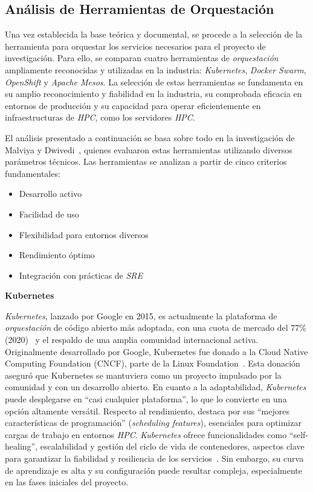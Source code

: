 \subsection{Análisis de Herramientas de Orquestación}
Una vez establecida la base teórica y documental, se procede a la selección de la herramienta para orquestar los servicios necesarios para el proyecto de investigación. Para ello, se comparan cuatro herramientas de \textit{orquestación} ampliamente reconocidas y utilizadas en la industria: \textit{Kubernetes}, \textit{Docker Swarm}, \textit{OpenShift} y \textit{Apache Mesos}. La selección de estas herramientas se fundamenta en su amplio reconocimiento y fiabilidad en la industria, su comprobada eficacia en entornos de producción y su capacidad para operar eficientemente en infraestructuras de \textit{HPC}, como los servidores \textit{HPC}.

El análisis presentado a continuación se basa sobre todo en la investigación de Malviya y Dwivedi~\cite{ref9}, quienes evaluaron estas herramientas utilizando diversos parámetros técnicos. Las herramientas se analizan a partir de cinco criterios fundamentales:
\begin{itemize}
    \item Desarrollo activo
    \item Facilidad de uso
    \item Flexibilidad para entornos diversos
    \item Rendimiento óptimo
    \item Integración con prácticas de \textit{SRE}
\end{itemize}

\noindent\textbf{Kubernetes}

\textit{Kubernetes}, lanzado por Google en 2015, es actualmente la plataforma de \textit{orquestación} de código abierto más adoptada, con una cuota de mercado del 77\% (2020)~\cite{ref7} y el respaldo de una amplia comunidad internacional activa. Originalmente desarrollado por Google, Kubernetes fue donado a la Cloud Native Computing Foundation (CNCF), parte de la Linux Foundation~\cite{ref37}. Esta donación aseguró que Kubernetes se mantuviera como un proyecto impulsado por la comunidad y con un desarrollo abierto.  En cuanto a la adaptabilidad, \textit{Kubernetes} puede desplegarse en ``casi cualquier plataforma'', lo que lo convierte en una opción altamente versátil. Respecto al rendimiento, destaca por sus ``mejores características de programación'' (\textit{scheduling features}), esenciales para optimizar cargas de trabajo en entornos \textit{HPC}. \textit{Kubernetes} ofrece funcionalidades como ``self-healing'', escalabilidad y gestión del ciclo de vida de contenedores, aspectos clave para garantizar la fiabilidad y resiliencia de los servicios~\cite{ref8}. Sin embargo, su curva de aprendizaje es alta y su configuración puede resultar compleja, especialmente en las fases iniciales del proyecto.

